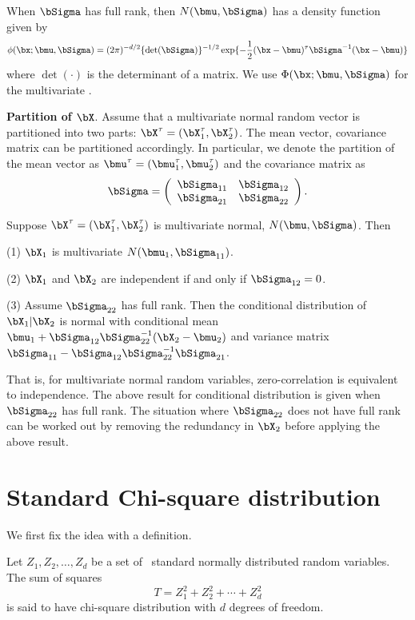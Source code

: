 When $\bSigma$ has full rank, then $N(\bmu, \bSigma)$
has a density function given by
\[
\phi(\bx; \bmu, \bSigma)
=
(2\pi)^{-d/2} \{\det(\bSigma)\}^{-1/2}
\exp \{ - \frac{1}{2} (\bx - \bmu)^\tau \bSigma^{-1} (\bx - \bmu) \}
\]
where $\det(\cdot)$ is the determinant of a matrix.
We use $\Phi(\bx; \bmu, \bSigma)$ for the multivariate
\cdf.

\vs
\noindent
{\bf Partition of $\bX$}.
Assume that a multivariate normal random vector is partitioned
into two parts: $\bX^\tau = (\bX_1^\tau, \bX_2^\tau)$. 
The mean vector, covariance matrix can be partitioned accordingly.
In particular, we denote the partition of the mean vector
as $\bmu^\tau = (\bmu_1^\tau, \bmu_2^\tau)$
and the covariance matrix as
\[
\bSigma =
\left (
\begin{array}{cc}
\bSigma_{11} & \bSigma_{12} \\
\bSigma_{21} & \bSigma_{22}
\end{array}
\right ).
\]

\begin{theorem}
Suppose
$\bX^\tau = (\bX_1^\tau, \bX_2^\tau)$ is multivariate normal,
$N(\bmu, \bSigma)$.
Then

(1) $\bX_1$ is multivariate $N(\bmu_1, \bSigma_{11})$.

(2) $\bX_1$ and $\bX_2$ are independent if and only if $\bSigma_{12} = 0$.

(3) Assume $\bSigma_{22}$ has full rank.
Then the conditional distribution of $\bX_1 | \bX_2$ is normal with conditional mean
$\bmu_1 + \bSigma_{12} \bSigma_{22}^{-1}(\bX_2 - \bmu_2)$
and variance matrix
$\bSigma_{11} - \bSigma_{12}\bSigma_{22}^{-1}\bSigma_{21}$.

\end{theorem}

That is, for multivariate normal random variables, 
zero-correlation is equivalent to independence.
The above result for conditional distribution is given
when $\bSigma_{22}$ has full rank. 
The situation where $\bSigma_{22}$ does not have full rank 
can be worked out by removing the redundancy in $\bX_2$
before applying the above result.

\section{Standard Chi-square distribution}

We first fix the idea with a definition.

\begin{defi}
Let $Z_1, Z_2, \ldots, Z_d$ be a set of \iid\ standard normally
distributed random variables. The sum of squares
\[
T = Z_1^2 + Z_2^2 + \cdots + Z_d^2
\]
is said to have chi-square distribution with $d$ degrees of
freedom.
\end{defi}

